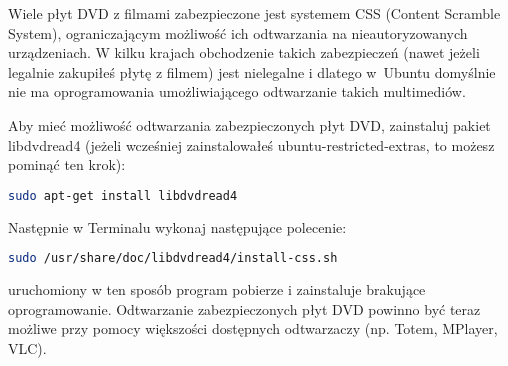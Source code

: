 Wiele płyt DVD z filmami zabezpieczone jest systemem CSS (Content Scramble System), ograniczającym możliwość ich odtwarzania na nieautoryzowanych urządzeniach. W kilku krajach obchodzenie takich zabezpieczeń (nawet jeżeli legalnie zakupiłeś płytę z filmem) jest nielegalne i dlatego w~Ubuntu domyślnie nie ma oprogramowania umożliwiającego odtwarzanie takich multimediów.

Aby mieć możliwość odtwarzania zabezpieczonych płyt DVD, zainstaluj pakiet \textcolor{ubuntu_orange}{libdvdread4} (jeżeli wcześniej zainstalowałeś ubuntu-restricted-extras, to możesz pominąć ten krok):

\begin{lstlisting}[language=bash]
sudo apt-get install libdvdread4
\end{lstlisting}

\noindent Następnie w Terminalu wykonaj następujące polecenie:

\begin{lstlisting}[language=bash]
sudo /usr/share/doc/libdvdread4/install-css.sh
\end{lstlisting}

\noindent uruchomiony w ten sposób program pobierze i zainstaluje brakujące oprogramowanie. Odtwarzanie zabezpieczonych płyt DVD powinno być teraz możliwe przy pomocy większości dostępnych odtwarzaczy (np. Totem, MPlayer, VLC).
